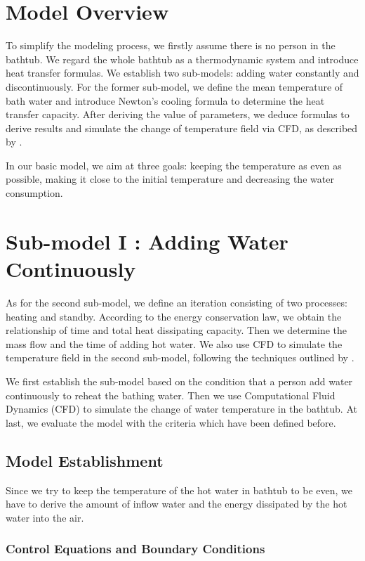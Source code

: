 \documentclass{mcmthesis}
\begin{document}
\section{Model Overview}

To simplify the modeling process, we firstly assume there is no person in the
bathtub. We regard the whole bathtub as a thermodynamic system and introduce
heat transfer formulas. We establish two sub-models: adding water constantly
and discontinuously. For the former sub-model, we define the mean temperature
of bath water and introduce Newton's cooling formula to determine the heat
transfer capacity. After deriving the value of parameters, we deduce formulas
to derive results and simulate the change of temperature field via CFD, as
described by \textcite{anderson2006}.

In our basic model, we aim at three goals: keeping the temperature as even as
possible, making it close to the initial temperature and decreasing the water
consumption.


\section{Sub-model I : Adding Water Continuously}

As for the second sub-model, we define an iteration consisting of two processes:
heating and standby. According to the energy conservation law, we obtain the
relationship of time and total heat dissipating capacity. Then we determine
the mass flow and the time of adding hot water. We also use CFD to simulate
the temperature field in the second sub-model, following the techniques
outlined by \textcite{website2024}.

We first establish the sub-model based on the condition that a person add water
continuously to reheat the bathing water. Then we use Computational Fluid
Dynamics (CFD) to simulate the change of water temperature in the bathtub. At
last, we evaluate the model with the criteria which have been defined before.

\subsection{Model Establishment}

Since we try to keep the temperature of the hot water in bathtub to be even,
we have to derive the amount of inflow water and the energy dissipated by the
hot water into the air.


\subsubsection{Control Equations and Boundary Conditions}
\end{document}
